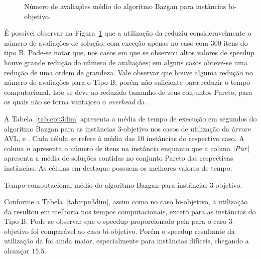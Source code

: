 \begin{figure}[]
  
  \caption{Número de avaliações médio do algoritmo Bazgan para instâncias bi-objetivo.}
  \label{fig:cmp2dim}
\end{figure}

É possível observar na Figura~\ref{fig:cmp2dim} que a utilização da 
reduziu consideravelmente o
número de avaliações de solução, com exceção apenas no caso com $300$ itens do tipo B.
Pode-se notar que, nos casos em que se observou altos valores de speedup
houve grande redução do número de avaliações; em alguns casos obteve-se
uma redução de uma ordem de grandeza.
Vale observar que houve alguma redução no número de avaliações
para o Tipo B, porém não suficiente para reduzir o tempo computacional.
Isto se deve ao reduzido tamanho de seus conjuntos Pareto, para os quais não
se torna vantajoso o \emph{overhead} da \kdtree{}.

A Tabela~\ref{tab:cpu3dim} apresenta a média de tempo de execução em segundos
do algoritmo Bazgan para as instâncias 3-objetivo nos casos de utilização da
árvore AVL,  e .
Cada célula se refere à média das 10 instâncias do respectivo caso.
A coluna $n$ apresenta o número de itens na instância enquanto que a
coluna $|Par|$ apresenta a média de soluções contidas no conjunto Pareto
das respectivas instâncias.
As células em destaque possuem os melhores valores de tempo.

\begin{table}[]
  \centering
  
  \caption{Tempo computacional médio do algoritmo Bazgan para instâncias 3-objetivo.}
  \label{tab:cpu3dim}
\end{table}

Conforme a Tabela~\ref{tab:cpu3dim}, assim como no caso bi-objetivo,
a utilização da \kdtree{} resultou em melhoria
nos tempos computacionais, exceto para as instâncias do Tipo B.
Pode-se observar que o speedup proporcionado pela  para o caso
3-objetivo foi comparável ao caso bi-objetivo.
Porém o speedup resultante da utilização da  foi ainda maior,
especialmente para instâncias difíceis, chegando a alcançar $15.5$.


